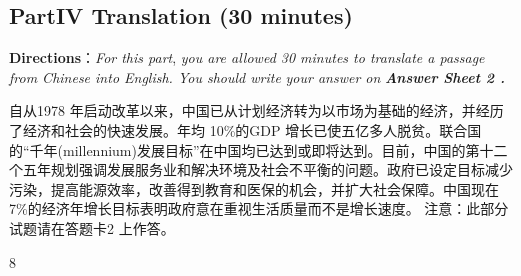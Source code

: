 \documentclass[UTF8,11pt]{ctexart}
\begin{document}
\subsection*{\textbf{Part}IV \textbf{Translation} \textbf{(30 minutes)}}


\textbf{Directions}：\textit{For this part},\textit{ you are allowed 30 minutes to translate a passage from Chinese into English. You should write} \textit{your answer on}\textbf{\textit{ Answer Sheet 2 .}}


自从1978 年启动改革以来，中国已从计划经济转为以市场为基础的经济，并经历了经济和社会的快速发展。年均 10\%的GDP 增长已使五亿多人脱贫。联合国的“千年(millennium)发展目标”在中国均已达到或即将达到。目前，中国的第十二个五年规划强调发展服务业和解决环境及社会不平衡的问题。政府已设定目标减少污染，提高能源效率，改善得到教育和医保的机会，并扩大社会保障。中国现在7\%的经济年增长目标表明政府意在重视生活质量而不是增长速度。 注意：此部分试题请在答题卡2 上作答。


8
\end{document}
